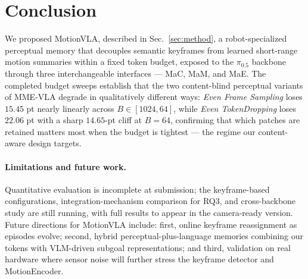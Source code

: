 \documentclass{article}
\begin{document}
\section{Conclusion}
\label{sec:conclusion}

We proposed MotionVLA, described in Sec.~\ref{sec:method}, a robot-specialized perceptual memory
that decouples semantic keyframes from learned short-range motion
summaries within a fixed token budget, exposed to the $\pi_{0.5}$
backbone through three interchangeable interfaces --- MaC, MaM, and MaE.
The completed budget sweeps establish that the two content-blind
perceptual variants of MME-VLA degrade in qualitatively different ways:
\emph{Even Frame Sampling} loses $15.45$ pt nearly linearly across
$B\!\in\![1024,64]$, while \emph{Even TokenDropping} loses $22.06$ pt
with a sharp $14.65$-pt cliff at $B\!=\!64$, confirming that which
patches are retained matters most when the budget is tightest --- the
regime our content-aware design targets.

\paragraph{Limitations and future work.}
Quantitative evaluation is incomplete at submission; the keyframe-based
configurations, integration-mechanism comparison for RQ3, and cross-backbone
study are still running, with full results to appear in the camera-ready
version. Future directions for MotionVLA include: first, online keyframe reassignment as
episodes evolve; second, hybrid perceptual-plus-language memories combining
our tokens with VLM-driven subgoal representations; and third, validation
on real hardware where sensor noise will further stress the keyframe
detector and MotionEncoder.


\begin{ack}
\end{ack}





\end{document}
